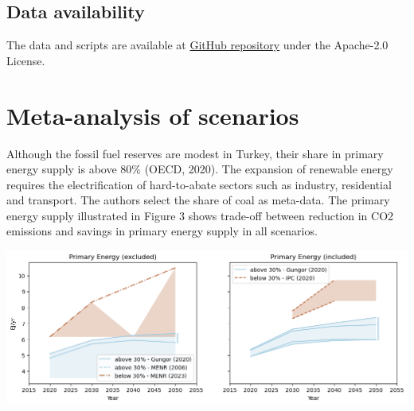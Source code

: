 \documentclass[a0,portrait]{a0poster}
\begin{document}
\begin{multicols}{3}


\begin{tcolorbox}[width=1.0\linewidth,colback={conclusion},frame empty]
\section{Data availability}

The data and scripts are available at \href{https://github.com/gorkemgungormetu/turkish\_energy\_and\_climate\_pathways.git}{GitHub repository} under the Apache-2.0 License.

\end{tcolorbox}    


\section{Meta-analysis of scenarios}

Although the fossil fuel reserves are modest in Turkey, their share in primary energy supply is above 80\% (OECD, 2020). The expansion of renewable energy requires the electrification of hard-to-abate sectors such as industry, residential and transport. The authors select the share of coal as meta-data. The primary energy supply illustrated in Figure 3 shows trade-off between reduction in CO2 emissions and savings in primary energy supply in all scenarios.

\begin{center}\vspace{1cm}
    \includegraphics[width=1.0\linewidth]{Figure_3}
\end{center}\vspace{1cm}



\end{multicols}
\end{document}

